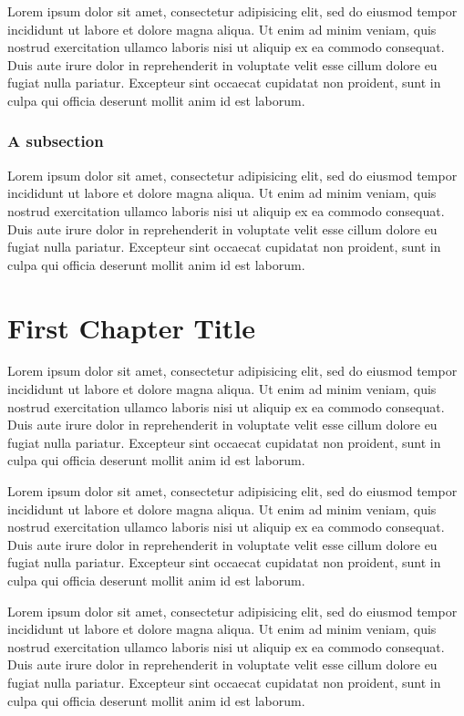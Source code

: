 \documentclass[12pt,letterpaper,oneside,final]{memoir}
\begin{document}
Lorem ipsum dolor sit amet, consectetur adipisicing elit, sed do eiusmod tempor incididunt ut labore et dolore magna aliqua. Ut enim ad minim veniam, quis nostrud exercitation ullamco laboris nisi ut aliquip ex ea commodo consequat. Duis aute irure dolor in reprehenderit in voluptate velit esse cillum dolore eu fugiat nulla pariatur. Excepteur sint occaecat cupidatat non proident, sunt in culpa qui officia deserunt mollit anim id est laborum.

\subsection{A subsection}
Lorem ipsum dolor sit amet, consectetur adipisicing elit, sed do eiusmod tempor incididunt ut labore et dolore magna aliqua. Ut enim ad minim veniam, quis nostrud exercitation ullamco laboris nisi ut aliquip ex ea commodo consequat. Duis aute irure dolor in reprehenderit in voluptate velit esse cillum dolore eu fugiat nulla pariatur. Excepteur sint occaecat cupidatat non proident, sunt in culpa qui officia deserunt mollit anim id est laborum.

\chapter{First Chapter Title}
\label{ch-1}
Lorem ipsum dolor sit amet, consectetur adipisicing elit, sed do eiusmod tempor incididunt ut labore et dolore magna aliqua. Ut enim ad minim veniam, quis nostrud exercitation ullamco laboris nisi ut aliquip ex ea commodo consequat. Duis aute irure dolor in reprehenderit in voluptate velit esse cillum dolore eu fugiat nulla pariatur. Excepteur sint occaecat cupidatat non proident, sunt in culpa qui officia deserunt mollit anim id est laborum.

Lorem ipsum dolor sit amet, consectetur adipisicing elit, sed do eiusmod tempor incididunt ut labore et dolore magna aliqua. Ut enim ad minim veniam, quis nostrud exercitation ullamco laboris nisi ut aliquip ex ea commodo consequat. Duis aute irure dolor in reprehenderit in voluptate velit esse cillum dolore eu fugiat nulla pariatur. Excepteur sint occaecat cupidatat non proident, sunt in culpa qui officia deserunt mollit anim id est laborum.

Lorem ipsum dolor sit amet, consectetur adipisicing elit, sed do eiusmod tempor incididunt ut labore et dolore magna aliqua. Ut enim ad minim veniam, quis nostrud exercitation ullamco laboris nisi ut aliquip ex ea commodo consequat. Duis aute irure dolor in reprehenderit in voluptate velit esse cillum dolore eu fugiat nulla pariatur. Excepteur sint occaecat cupidatat non proident, sunt in culpa qui officia deserunt mollit anim id est laborum.
\end{document}
